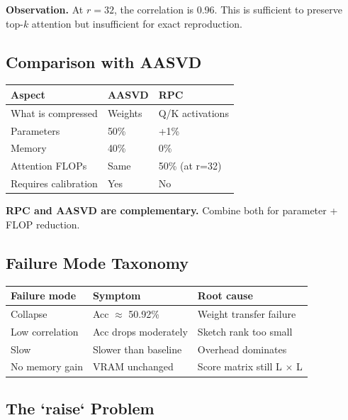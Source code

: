 \textbf{Observation.} At $r = 32$, the correlation is 0.96. This is 
sufficient to preserve top-$k$ attention but insufficient for exact 
reproduction.

\subsection{Comparison with AASVD}

\begin{table}[H]
\centering
\small
\begin{tabular}{lll}
\toprule
\textbf{Aspect} & \textbf{AASVD} & \textbf{RPC} \\
\midrule
What is compressed & Weights & Q/K activations \\
Parameters & 50\% & +1\% \\
Memory & 40\% & 0\% \\
Attention FLOPs & Same & 50\% (at r=32) \\
Requires calibration & Yes & No \\
\bottomrule
\end{tabular}
\end{table}

\textbf{RPC and AASVD are complementary.} Combine both for parameter + FLOP 
reduction.

\subsection{Failure Mode Taxonomy}

\begin{table}[H]
\centering
\small
\begin{tabular}{lll}
\toprule
\textbf{Failure mode} & \textbf{Symptom} & \textbf{Root cause} \\
\midrule
Collapse & Acc $\approx$ 50.92\% & Weight transfer failure \\
Low correlation & Acc drops moderately & Sketch rank too small \\
Slow & Slower than baseline & Overhead dominates \\
No memory gain & VRAM unchanged & Score matrix still L $\times$ L \\
\bottomrule
\end{tabular}
\end{table}

\subsection{The `raise` Problem}

